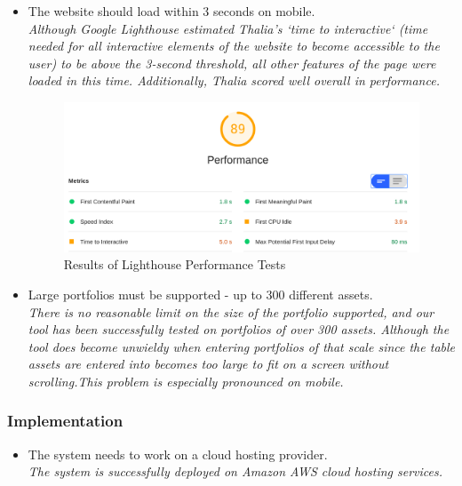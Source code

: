 \documentclass[main.tex]{subfiles}
\begin{document}
\begin{itemize}
\item The website should load within 3 seconds on mobile.\\
\textit{Although Google Lighthouse estimated Thalia’s `time to interactive` (time needed for all interactive elements of the website to become accessible to the user) to be above the 3-second threshold, all other features of the page were loaded in this time. Additionally, Thalia scored well overall in performance.}



\begin{figure}[H]
   \centering
   \includegraphics[scale=0.3]{07Evaluation/07Pictures/performanceLighthouse.png}
   \caption{Results of Lighthouse Performance Tests}
   \label{LighthousePerf}
\end{figure}



\item Large portfolios must be supported - up to 300 different assets.\\
\textit{There is no reasonable limit on the size of the portfolio supported, and our tool has been successfully tested on portfolios of over 300 assets. Although the tool does become unwieldy when entering portfolios of that scale since the table assets are entered into becomes too large to fit on a screen without scrolling.This problem is especially pronounced on mobile.}

\end{itemize}

\subsubsection{Implementation}
\begin{itemize}

\item The system needs to work on a cloud hosting provider.\\
\textit{The system is successfully deployed on Amazon AWS cloud hosting services.}

\end{itemize}
\end{document}
